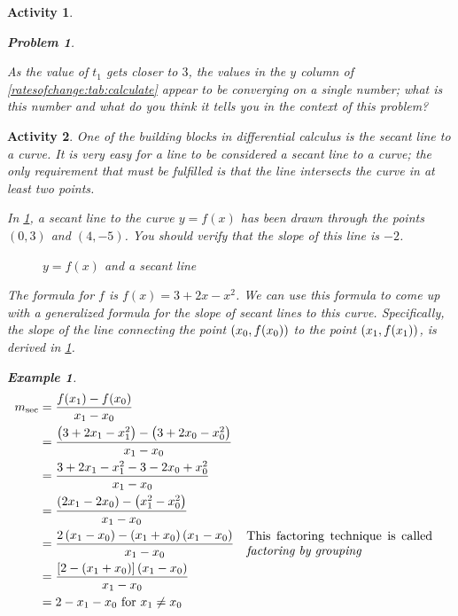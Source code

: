 \documentclass[12pt]{article}
\theoremstyle{activity}
\newtheorem{activity}{Activity}
\theoremstyle{problem}
\newtheorem{problem}{Problem}
\theoremstyle{example}
\newtheorem{example}{Example}
\theoremstyle{definition}
\theoremstyle{exercises}
\theoremstyle{exercise}
\begin{document}
\begin{activity}{}
\begin{problem}{}
\begin{parts}
\item As the value of $t_1$ gets closer to $3$, the values in the $y$ column of \cref{ratesofchange:tab:calculate} appear to be
converging on a single number; what is this number and what do you think it tells you in the context of this problem? 

\end{parts}

\end{problem}

\end{activity}


\begin{activity}{}
One of the building blocks in differential calculus is \emph{the secant line to a curve}. It is very easy for a line to be considered a secant line to a curve; the only requirement that must be fulfilled is that the line intersects the curve in at least two points. 

In \cref{ratesofchange:fig:secant}, a secant line to the curve $y=f(x)$ has been drawn through the points $(0,3)$ and $(4,-5)$. You should verify that the slope of this line is $-2$.

\begin{figure}[!ht]
\centering
{}
\caption{$y=f(x)$ and a secant line}\label{ratesofchange:fig:secant}
\end{figure}

The formula for $f$ is $f(x)=3+2x-x^2$. We can use this formula to come up with a generalized formula for the slope of secant lines to this curve. Specifically, the slope of the line connecting the point $\left(x_0,f\mleft(x_0\mright)\right)$ to the point $\left(x_1,f\mleft(x_1\mright)\right)$, is derived in \cref{ratesofchange:ex:secant}. 

\begin{example}\label{ratesofchange:ex:secant}
\begin{align*}
m_{\text{sec}}
&= \frac{f\mleft(x_1\mright)-f\mleft(x_0\mright)}{x_1-x_0}\\
&= \frac{\left(3+2x_1-x_1^2\right)-\left(3+2x_0-x_0^2\right)}{x_1-x_0}\\
&= \frac{3+2x_1-x_1^2-3-2x_0+x_0^2}{x_1-x_0}\\
&= \frac{\left(2x_1-2x_0\right)-\left(x_1^2-x_0^2\right)}{x_1-x_0}\\
&= \frac{2\left(x_1-x_0\right)-\left(x_1+x_0\right)\left(x_1-x_0\right)}{x_1-x_0}&&\parbox{15em}{This factoring technique is called \emph{factoring by grouping}}\\
&= \frac{\left[2-\left(x_1+x_0\right)\right]\left(x_1-x_0\right)}{x_1-x_0}\\
&=2-x_1-x_0\text{ for }x_1\neq x_0
\end{align*}
\end{example}


\end{activity}
\end{document}
